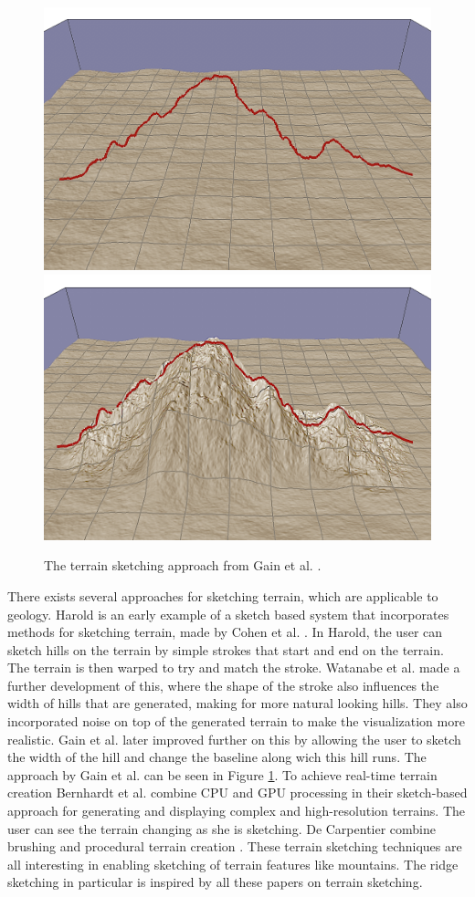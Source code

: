 \documentclass[a4paper,12pt]{report}
\begin{document}
\begin{figure}
\centering
 \includegraphics[width=0.4\linewidth]{thesis/related/img-001.png}
 \includegraphics[width=0.4\linewidth]{thesis/related/img-002.png}
 \caption{The terrain sketching approach from Gain et al. \cite{Gain:2009:TS:1507149.1507155}. }
 \label{fig:gain}
\end{figure}


There exists several approaches for sketching terrain, which are applicable to geology. Harold is an early example of a sketch based system that incorporates methods for sketching terrain, made by Cohen et al. \cite{cohen2000harold}. In Harold, the user can sketch hills on the terrain by simple strokes that start and end on the terrain. The terrain is then warped to try and match the stroke. Watanabe et al.  \cite{Watanabe:2004:SIT:1186415.1186500} made a further development of this, where the shape of the stroke also influences the width of hills that are generated, making for more natural looking hills. They also incorporated noise on top of the generated terrain to make the visualization more realistic. Gain et al. \cite{Gain:2009:TS:1507149.1507155} later improved further on this by allowing the user to sketch the width of the hill and change the baseline along wich this hill runs. The approach by Gain et al. can be seen in Figure \ref{fig:gain}. To achieve real-time terrain creation Bernhardt et al. 
combine CPU and GPU processing in their sketch-based approach for generating and displaying complex and high-resolution terrains. The user can see the terrain changing as she is sketching. De Carpentier combine brushing and procedural terrain creation \cite{de2009interactive}. These terrain sketching techniques are all interesting in enabling sketching of terrain features like mountains. The ridge sketching in particular is inspired by all these papers on terrain sketching.
\end{document}
